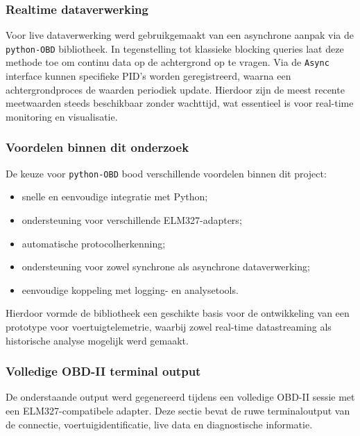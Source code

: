 \subsubsection{Realtime dataverwerking}
Voor live dataverwerking werd gebruikgemaakt van een asynchrone aanpak via de \texttt{python-OBD} bibliotheek. In tegenstelling tot klassieke blocking queries laat deze methode toe om continu data op de achtergrond op te vragen.
Via de \texttt{Async} interface kunnen specifieke PID's worden geregistreerd, waarna een achtergrondproces de waarden periodiek update. Hierdoor zijn de meest recente meetwaarden steeds beschikbaar zonder wachttijd, wat essentieel is voor real-time monitoring en visualisatie.

\subsubsection{Voordelen binnen dit onderzoek}
De keuze voor \texttt{python-OBD} bood verschillende voordelen binnen dit project:
\begin{itemize}
    \item snelle en eenvoudige integratie met Python;
    \item ondersteuning voor verschillende ELM327-adapters;
    \item automatische protocolherkenning;
    \item ondersteuning voor zowel synchrone als asynchrone dataverwerking;
    \item eenvoudige koppeling met logging- en analysetools.
\end{itemize}
Hierdoor vormde de bibliotheek een geschikte basis voor de ontwikkeling van een prototype voor voertuigtelemetrie, waarbij zowel real-time datastreaming als historische analyse mogelijk werd gemaakt.

\appendix
\subsubsection{Volledige OBD-II terminal output}
De onderstaande output werd gegenereerd tijdens een volledige OBD-II sessie met een ELM327-compatibele adapter. Deze sectie bevat de ruwe terminaloutput van de connectie, voertuigidentificatie, live data en diagnostische informatie.

